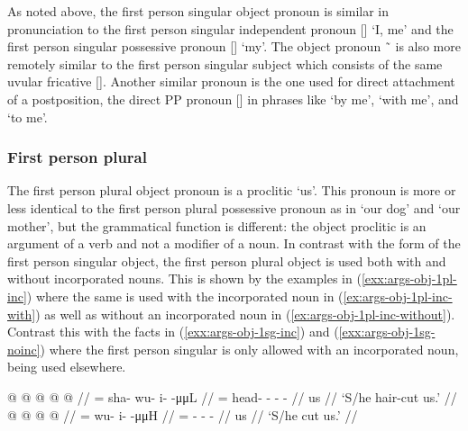 As noted above, the first person singular object pronoun is similar in pronunciation to the first person singular independent pronoun  [] ‘I, me’ and the first person singular possessive pronoun  [] ‘my’. The object pronoun  \~\  is also more remotely similar to the first person singular subject  which consists of the same uvular fricative []. Another similar pronoun is the one used for direct attachment of a postposition, the direct PP pronoun  [] in phrases like  ‘by me’,  ‘with me’, and  ‘to me’.


\subsubsection{First person plural}\label{sec:args-obj-1pl}

The first person plural object pronoun is a proclitic  ‘us’. This pronoun is more or less identical to the first person plural possessive pronoun as in  ‘our dog’ and  ‘our mother’, but the grammatical function is different: the object proclitic  is an argument of a verb and not a modifier of a noun. In contrast with the  form of the first person singular object, the first person plural object  is used both with and without incorporated nouns. This is shown by the examples in (\ref{exx:args-obj-1pl-inc}) where the same  is used with the incorporated noun  in (\ref{ex:args-obj-1pl-inc-with}) as well as without an incorporated noun in (\ref{ex:args-obj-1pl-inc-without}). Contrast this with the facts in (\ref{exx:args-obj-1sg-inc}) and (\ref{exx:args-obj-1sg-noinc}) where the first person singular  is only allowed with an incorporated noun,  being used elsewhere.

\pex\label{exx:args-obj-1pl-inc}%
\a\label{ex:args-obj-1pl-inc-with}%
%
\begingl
	\gla	{} @  @ {} @ {} @ {} @ {} //
	\glb	{}= sha- wu- i-  -μμL //
	\glc	{}= head- - -  - //
	\gld	us  {} {} {} {} //
	\glft	‘S/he hair-cut us.’
		//
\endgl
\a\label{ex:args-obj-1pl-inc-without}%
%
\begingl
	\gla	{} @  @ {} @ {} @ {} //
	\glb	{}= wu- i-  -μμH //
	\glc	{}= - -  - //
	\gld	us  //
	\glft	‘S/he cut us.’
		//
\endgl
\xe

